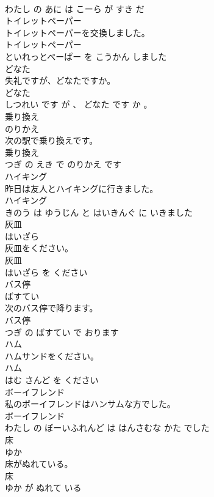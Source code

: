 \documentclass[8pt]{extreport}
\begin{document}
\begin{CJK}{UTF8}{min}
\\	わたし の あに は こーら が すき だ			
\\	トイレットペーパー	
\\	トイレットペーパーを交換しました。	
\\	トイレットペーパー 
\\	といれっとぺーぱー を こうかん しました			
\\	どなた	
\\	失礼ですが、どなたですか。	
\\	どなた 
\\	しつれい です が 、 どなた です か 。			
\\	乗り換え	
\\	のりかえ			
\\	次の駅で乗り換えです。	
\\	乗り換え 
\\	つぎ の えき で のりかえ です			
\\	ハイキング	
\\	昨日は友人とハイキングに行きました。	
\\	ハイキング 
\\	きのう は ゆうじん と はいきんぐ に いきました			
\\	灰皿	
\\	はいざら			
\\	灰皿をください。	
\\	灰皿 
\\	はいざら を ください			
\\	バス停	
\\	ばすてい			
\\	次のバス停で降ります。	
\\	バス停 
\\	つぎ の ばすてい で おります			
\\	ハム	
\\	ハムサンドをください。	
\\	ハム 
\\	はむ さんど を ください			
\\	ボーイフレンド	
\\	私のボーイフレンドはハンサムな方でした。	
\\	ボーイフレンド 
\\	わたし の ぼーいふれんど は はんさむな かた でした			
\\	床	
\\	ゆか			
\\	床がぬれている。	
\\	床 
\\	ゆか が ぬれて いる			

\end{CJK}
\end{document}
